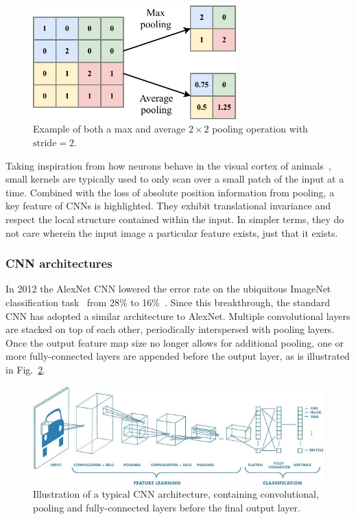 \begin{figure} %
    \includegraphics[width=0.7\textwidth]{diagrams/6-cnn/pooling.pdf}
    \caption[Example of pooling operation]
    {Example of both a max and average $2 \times 2$ pooling operation with $\text{stride}=2$.}
    \label{fig:pooling}
\end{figure}

Taking inspiration from how neurons behave in the visual cortex of animals~\cite{lecun2015}, small
kernels are typically used to only scan over a small patch of the input at a time. Combined with
the loss of absolute position information from pooling, a key feature of CNNs is highlighted. They
exhibit translational invariance and respect the local structure contained within the input. In
simpler terms, they do not care wherein the input image a particular feature exists, just that it
exists.

\subsubsection*{CNN architectures}

In 2012 the AlexNet CNN lowered the error rate on the ubiquitous ImageNet classification
task~\cite{deng2009} from 28\% to 16\%~\cite{krizhevsky2012}. Since this breakthrough, the
standard CNN has adopted a similar architecture to AlexNet. Multiple convolutional layers are
stacked on top of each other, periodically interspersed with pooling layers. Once the output
feature map size no longer allows for additional pooling, one or more fully-connected layers are
appended before the output layer, as is illustrated in Fig.~\ref{fig:conv_diagram}.

\begin{figure} %
    \includegraphics[width=\textwidth]{diagrams/6-cnn/conv_diagram.pdf}
    \caption[Typical Convolutional Neural Network architecture]
    {Illustration of a typical CNN architecture, containing convolutional, pooling and
        fully-connected layers before the final output layer.}
    \label{fig:conv_diagram}
\end{figure}

